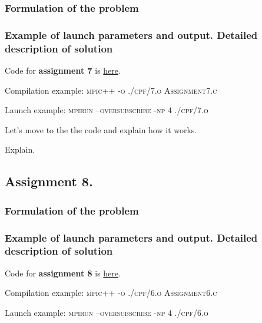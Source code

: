 \documentclass[%
12pt, %
final, %
oneside, %
onecolumn, %
centertags]{article} %
\theoremstyle{plain}
\theoremstyle{definition}
\theoremstyle{remark}
\begin{document}
\subsubsection{Formulation of the problem}

\subsubsection{Example of launch parameters and output. Detailed description of solution}

Code for \textbf{assignment 7} is \href{https:\//github.com/aptmess/parallel_algorithms/blob/master/HT/hw_mpi/Assignment7.c}{here}.

Compilation example: \textsc{mpic++ -o ./cpf/7.o Assignment7.c}

Launch example: \textsc{mpirun --oversubscribe -np 4 ./cpf/7.o}


Let's move to the the code and explain how it works.



Explain. 

\newpage
\subsection{Assignment 8.}

\subsubsection{Formulation of the problem}



\subsubsection{Example of launch parameters and output. Detailed description of solution}

Code for \textbf{assignment 8} is \href{https:\//github.com/aptmess/parallel_algorithms/blob/master/HT/hw_mpi/Assignment8.c}{here}.

Compilation example: \textsc{mpic++ -o ./cpf/6.o Assignment6.c}

Launch example: \textsc{mpirun --oversubscribe -np 4 ./cpf/6.o}
\end{document}
